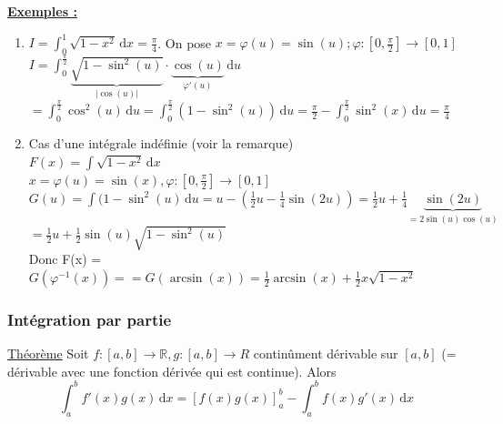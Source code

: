 \documentclass[12pt,a4paper]{article}
\newcommand{\evid}[1]{\textbf{\underline{#1}}}
\newcommand{\R}{\ensuremath{\mathbb{R}} }
\newcommand{\Theoreme}{\underline{Théorème} }
\newcommand{\intx}[3]{\ensuremath{\int_{#1}^{#2} #3 \, \mathrm dx}}
\begin{document}
{\evid{Exemples :}
\begin{enumerate}
	\item $I = \intx{0}{1}{\sqrt{1-x^2}} = \frac{\pi}{4}$. On pose $x =\varphi(u) = \sin(u); \varphi : [0,\frac{\pi}{2}] \to [0,1]$\\
	$I = \int_0^{\frac{\pi}{2}} \underbrace{\sqrt{1-\sin^2(u)}}_{|\cos(u)|} \cdot \underbrace{\cos(u)}_{\varphi'(u)} \, \mathrm du$\\
	$= \int_0^{\frac{\pi}{2}} \cos^2(u) \, \mathrm du = \int_0^{\frac{\pi}{2}} (1-\sin^2(u)) \, \mathrm du = \frac{\pi}{2} - \int_0^\frac{\pi}{2} \sin^2(x) \, \mathrm du = \frac{\pi}{4}$
	\item Cas d'une intégrale indéfinie (voir la remarque)\\
	$F(x) = \int \sqrt{1-x^2} \, \mathrm dx $\\
	$x = \varphi(u) = \sin(x), \varphi : [0,\frac{\pi}{2}] \to [0,1]$\\
	$G(u) = \int (1-\sin^2(u) \, \mathrm du = u-(\frac{1}{2}u - \frac{1}{4}\sin(2u)) = \frac{1}{2}u + \frac{1}{4}\underbrace{\sin(2u)}_{=2\sin(u)\cos(u)}$\\
	$= \frac{1}{2}u + \frac{1}{2} \sin(u)\sqrt{1-\sin^2(u)}$\\
	Donc F(x) = $G(\varphi^{-1}(x)) =  = G(\arcsin(x)) = \frac{1}{2}\arcsin(x) + \frac{1}{2}x\sqrt{1-x^2}$
\end{enumerate}
\subsubsection{Intégration par partie}
\begin{boite}
	\Theoreme Soit $f: [a,b] \to \R, g : [a,b] \to R$ continûment dérivable sur $[a,b]$ (= dérivable avec une fonction dérivée qui est continue). Alors 
	\begin{equation}
		\intx{a}{b}{f'(x)g(x)} = [f(x)g(x)]_a^b - \intx{a}{b}{f(x)g'(x)}
	\end{equation}


\end{boite}}
\end{document}
